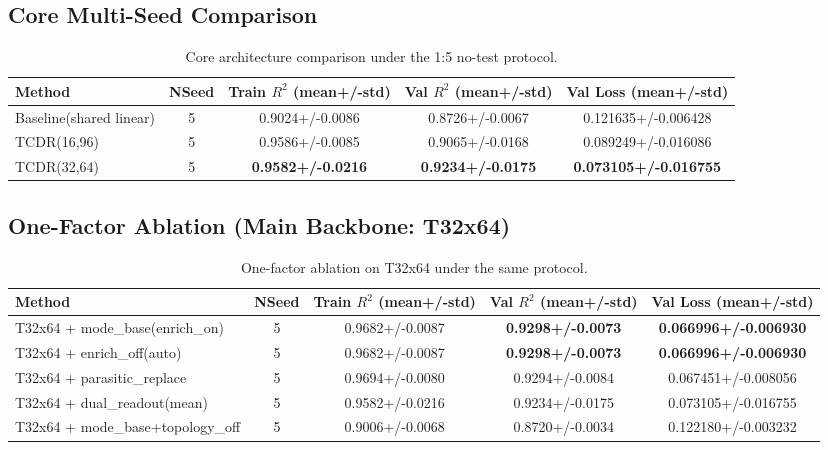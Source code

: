 \documentclass[11pt,a4paper]{article}
\begin{document}
\subsection{Core Multi-Seed Comparison}
\begin{table}[htbp]
\centering
\small
\begin{tabular}{lcccc}
\toprule
Method & NSeed & Train $R^2$ (mean+/-std) & Val $R^2$ (mean+/-std) & Val Loss (mean+/-std) \\
\midrule
Baseline(shared linear) & 5 & 0.9024+/-0.0086 & 0.8726+/-0.0067 & 0.121635+/-0.006428 \\
TCDR(16,96) & 5 & 0.9586+/-0.0085 & 0.9065+/-0.0168 & 0.089249+/-0.016086 \\
TCDR(32,64) & 5 & \textbf{0.9582+/-0.0216} & \textbf{0.9234+/-0.0175} & \textbf{0.073105+/-0.016755} \\
\bottomrule
\end{tabular}
\caption{Core architecture comparison under the 1:5 no-test protocol.}
\end{table}

\subsection{One-Factor Ablation (Main Backbone: T32x64)}
\begin{table}[htbp]
\centering
\small
\begin{tabular}{lcccc}
\toprule
Method & NSeed & Train $R^2$ (mean+/-std) & Val $R^2$ (mean+/-std) & Val Loss (mean+/-std) \\
\midrule
T32x64 + mode\_base(enrich\_on) & 5 & 0.9682+/-0.0087 & \textbf{0.9298+/-0.0073} & \textbf{0.066996+/-0.006930} \\
T32x64 + enrich\_off(auto) & 5 & 0.9682+/-0.0087 & \textbf{0.9298+/-0.0073} & \textbf{0.066996+/-0.006930} \\
T32x64 + parasitic\_replace & 5 & 0.9694+/-0.0080 & 0.9294+/-0.0084 & 0.067451+/-0.008056 \\
T32x64 + dual\_readout(mean) & 5 & 0.9582+/-0.0216 & 0.9234+/-0.0175 & 0.073105+/-0.016755 \\
T32x64 + mode\_base+topology\_off & 5 & 0.9006+/-0.0068 & 0.8720+/-0.0034 & 0.122180+/-0.003232 \\
\bottomrule
\end{tabular}
\caption{One-factor ablation on T32x64 under the same protocol.}
\end{table}
\end{document}
